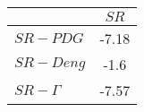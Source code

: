 \begin{tabular}{l|c}
\toprule
{} &  $SR$ \\
\midrule
\textbf{$SR-PDG$   } & -7.18 \\
\textbf{$SR-Deng$  } &  -1.6 \\
\textbf{$SR-\Gamma$} & -7.57 \\
\bottomrule
\end{tabular}

